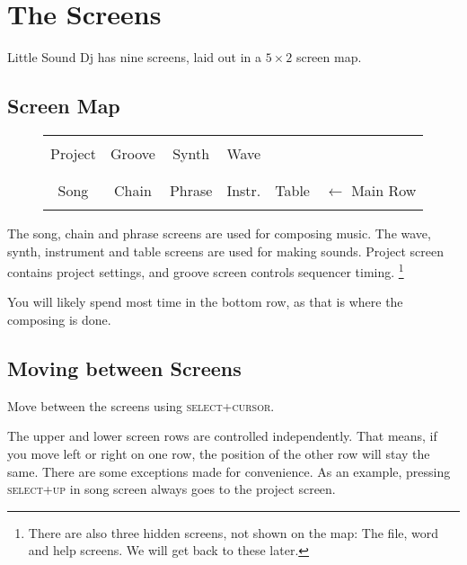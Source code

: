 \chapter{The Screens}
Little Sound Dj has nine screens, laid out in a \begin{math} 5 \times 2 \end{math} screen map.

\section{Screen Map}

\begin{figure}[htbp]
\centering
\begin{tabular}{|c|c|c|c|c|l}
	\cline{0-3}
    & & & \\
    Project & Groove & Synth & Wave \\
    & & & \\
	\cline{0-4}
	& & & & & \\
	Song & Chain & Phrase & Instr. & Table  & \begin{math} \leftarrow \end{math} Main Row \\
	& & & & & \\
	\cline{0-4}
\end{tabular}
\end{figure}

The song, chain and phrase screens are used for composing music. The wave, synth,
instrument and table screens are used for making sounds.
Project screen contains project settings, and groove screen controls sequencer timing.
\footnote{There are also three hidden
screens, not shown on the map: The file, word and help screens. We will get back to these later.}

You will likely spend most time in the bottom row, as that is where the composing is done.

\section{Moving between Screens}

Move between the screens using \textsc{select+cursor}.

The upper and lower screen rows are controlled independently. That means, if you move
left or right on one row, the position of the other row will stay the same.
There are some exceptions made for convenience.
As an example, pressing \textsc{select+up} in song screen always goes to the project
screen.

